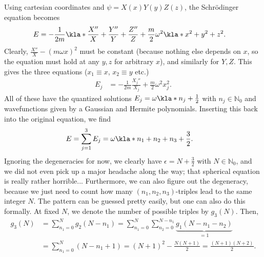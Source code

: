 \documentclass[english, parskip=full]{scrartcl}
\begin{document}
Using cartesian coordinates and $\psi=X(x)Y(y)Z(z)$, the Schrödinger equation becomes
\begin{align}
E &= -\frac{1}{2m} \kla*{\frac{X''}{X} + \frac{Y''}{Y} + \frac{Z''}{Z}} + \frac{m}{2}\omega^2 \kla*{x^2+y^2+z^2}.
\end{align}
Clearly, $\frac{X''}{X} - (m\omega x)^2$ must be constant (because nothing else depends on $x$, so the equation must hold at any $y,z$ for arbitrary $x$), and similarly for $Y,Z$.
This gives the three equations ($x_1 \equiv x$, $x_2 \equiv y$ etc.)
\begin{align}
E_j &= -\frac{1}{2m} \frac{X_j''}{X_j} + \frac{m}{2}\omega^2 x_j^2.
\end{align}
All of these have the quantized solutions $E_j = \omega \kla*{n_j + \frac{1}{2}}$ with $n_j\in\mathbb{N}_0$ and wavefunctions given by a Gaussian and Hermite polynomials.
Inserting this back into the original equation, we find
\begin{align}
E &= \sum_{j=1}^3 E_j = \omega \kla*{n_1+n_2+n_3 + \frac{3}{2}}.
\end{align}
Ignoring the degeneracies for now, we clearly have $\epsilon = N+\frac{3}{2}$ with $N\in\mathbb{N}_0$, and we did not even pick up a major headache along the way; that spherical equation is really rather horrible...
Furthermore, we can also figure out the degeneracy, because we just need to count how many $(n_1,n_2,n_3)$-triples lead to the same integer $N$.
The pattern can be guessed pretty easily, but one can also do this formally.
At fixed $N$, we denote the number of possible triples by $g_3(N)$.
Then,
\begin{align}
g_3(N) &= \sum_{n_1=0}^N g_2(N-n_1) = \sum_{n_1=0}^N \sum_{n_2=0}^{N-n_1} \underbrace{g_1(N-n_1-n_2)}_{=1}\\
&= \sum_{n_1=0}^N (N-n_1+1) = (N+1)^2 - \frac{N(N+1)}{2} = \frac{(N+1)(N+2)}{2}.
\end{align}
\end{document}
